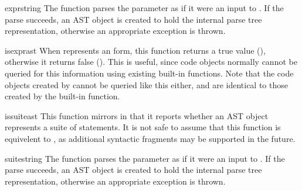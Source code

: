 \begin{funcdesc}{expr}{string}
The  function parses the parameter 
as if it were an input to .  If
the parse succeeds, an AST object is created to hold the internal
parse tree representation, otherwise an appropriate exception is
thrown.
\end{funcdesc}


\begin{funcdesc}{isexpr}{ast}
When  represents an  form, this function
returns a true value (), otherwise it returns false
().  This is useful, since code objects normally cannot be
queried for this information using existing built-in functions.  Note
that the code objects created by  cannot be queried
like this either, and are identical to those created by the built-in
 function.
\end{funcdesc}


\begin{funcdesc}{issuite}{ast}
This function mirrors  in that it reports whether an
AST object represents a suite of statements.  It is not safe to assume
that this function is equivelent to , as
additional syntactic fragments may be supported in the future.
\end{funcdesc}


\begin{funcdesc}{suite}{string}
The  function parses the parameter 
as if it were an input to .  If
the parse succeeds, an AST object is created to hold the internal
parse tree representation, otherwise an appropriate exception is
thrown.
\end{funcdesc}


